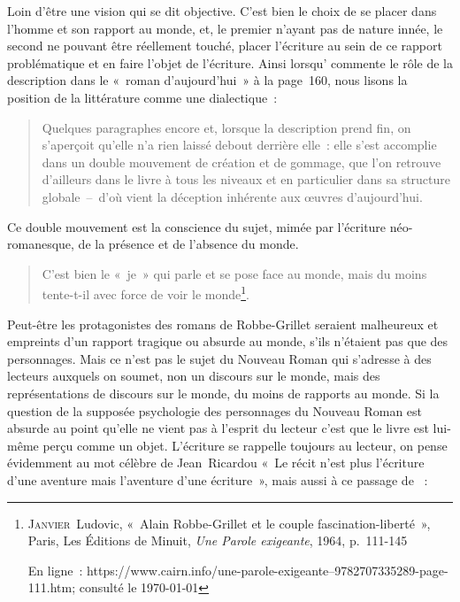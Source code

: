 \documentclass[12pt, a4paper]{article}
\begin{document}
Loin d'être une vision qui se dit objective. C'est bien le choix de se placer dans l'homme et son rapport au monde, et, le premier n'ayant pas de nature innée, le second ne pouvant être réellement touché, placer l'écriture au sein de ce rapport problématique et en faire l'objet de l'écriture. Ainsi lorsqu'\robbe{} commente le rôle de la description dans le «~roman d'aujourd'hui~» à la page~160, nous lisons la position de la littérature comme une dialectique~:
\begin{quote}
Quelques paragraphes encore et, lorsque la description prend fin, on s’aperçoit qu’elle n’a rien laissé debout derrière elle~: elle s’est accomplie dans un double mouvement de création et de gommage, que l’on retrouve d’ailleurs dans le livre à tous les niveaux et en particulier dans sa structure globale~–~d’où vient la déception inhérente aux œuvres d’aujourd’hui.
\end{quote}
Ce double mouvement est la conscience du sujet, mimée par l'écriture néo-romanesque, de la présence et de l'absence du monde.
\begin{quote}
     C’est bien le «~je~» qui parle et se pose face au monde, mais du moins tente-t-il avec force de voir le monde\footnote{\textsc{Janvier}~Ludovic, «~Alain Robbe-Grillet et le couple fascination-liberté~», Paris, Les Éditions de Minuit, \textit{Une Parole exigeante}, 1964, p.~111-145

En ligne~: https://www.cairn.info/une-parole-exigeante--9782707335289-page-111.htm; consulté le \today}.
\end{quote}
Peut-être les protagonistes des romans de Robbe-Grillet seraient malheureux et empreints d'un rapport tragique ou absurde au monde, s'ils n'étaient pas que des personnages. Mais ce n'est pas le sujet du Nouveau Roman qui s'adresse à des lecteurs auxquels on soumet, non un discours sur le monde, mais des représentations de discours sur le monde, du moins de rapports au monde. Si la question de la supposée psychologie des personnages du Nouveau Roman est absurde au point qu'elle ne vient pas à l'esprit du lecteur c'est que le livre est lui-même perçu comme un objet. L'écriture se rappelle toujours au lecteur, on pense évidemment au mot célèbre de Jean~Ricardou «~Le récit n'est plus l'écriture d'une aventure mais l'aventure d'une écriture~», mais aussi à ce passage de \punr~:
\end{document}

